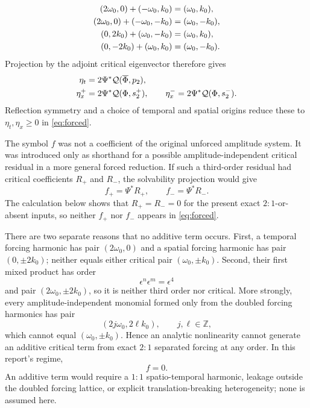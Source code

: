 \begin{align}
 (2\omega_0,0)+(-\omega_0,k_0)&=(\omega_0,k_0),\notag\\
 (2\omega_0,0)+(-\omega_0,-k_0)&=(\omega_0,-k_0),
 \label{eq:pure21-temporal-selection}\\
 (0,2k_0)+(\omega_0,-k_0)&=(\omega_0,k_0),\notag\\
 (0,-2k_0)+(\omega_0,k_0)&=(\omega_0,-k_0).
 \label{eq:pure21-spatial-selection}
\end{align}
Projection by the adjoint critical eigenvector therefore gives
\begin{align}
 \eta_t&=2\Psi^*\mathcal Q(\overline\Phi,p_2),\notag\\
 \eta_x^+&=2\Psi^*\mathcal Q(\Phi,s_2^+),\qquad
 \eta_x^-=2\Psi^*\mathcal Q(\Phi,s_2^-).
 \label{eq:pure21-eta}
\end{align}
Reflection symmetry and a choice of temporal and spatial origins reduce
these to $\eta_t,\eta_x\geq0$ in \eqref{eq:forced}.

The symbol $f$ was not a coefficient of the original unforced amplitude
system.  It was introduced only as shorthand for a possible
amplitude-independent critical residual in a more general forced reduction.
If such a third-order residual had critical coefficients $R_+$ and $R_-$,
the solvability projection would give
\begin{equation}
 f_+=\Psi^*R_+,
 \qquad
 f_-=\Psi^*R_-.
 \label{eq:pure21-f-origin}
\end{equation}
The calculation below shows that $R_+=R_-=0$ for the present exact
$2{:}1$-or-absent inputs, so neither $f_+$ nor $f_-$ appears in
\eqref{eq:forced}.

There are two separate reasons that no additive term occurs. First, a
temporal forcing harmonic has pair $(2\omega_0,0)$ and a spatial forcing
harmonic has pair $(0,\pm2k_0)$; neither equals either critical pair
$(\omega_0,\pm k_0)$. Second, their first mixed product has order
\begin{equation}
 \epsilon^n\epsilon^m=\epsilon^4
 \label{eq:pure21-order-four}
\end{equation}
and pair $(2\omega_0,\pm2k_0)$, so it is neither third order nor critical.
More strongly, every amplitude-independent monomial formed only from the
doubled forcing harmonics has pair
\begin{equation}
 (2j\omega_0,2\ell k_0),\qquad j,\ell\in\mathbb Z,
 \label{eq:pure21-even-lattice}
\end{equation}
which cannot equal $(\omega_0,\pm k_0)$. Hence an analytic nonlinearity
cannot generate an additive critical term from exact $2{:}1$ separated
forcing at any order. In this report's regime,
\begin{equation}
 \boxed{f=0.}
 \label{eq:pure21-fzero}
\end{equation}
An additive term would require a $1{:}1$ spatio-temporal harmonic, leakage
outside the doubled forcing lattice, or explicit translation-breaking
heterogeneity; none is assumed here.

